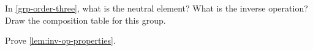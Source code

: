 \vfill%

\begin{gradedexercise}
    \label{ex:GroupWithThreeElements}
    In \cref{grp-order-three}, what is the neutral element?
    What is the inverse operation?
    Draw the composition table for this group.
\end{gradedexercise}

\begin{gradedexercise}
    \label{ex:GroupInverseProperties}
    Prove \cref{lem:inv-op-properties}.
\end{gradedexercise}

